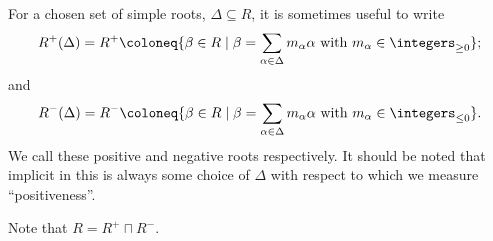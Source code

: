 \documentclass[fleqn]{NotesClass}
\begin{document}
    \begin{ntn}{}{}
        For a chosen set of simple roots, \(\Delta \subseteq R\), it is sometimes useful to write
        \begin{equation}
            R^+(\Delta) = R^+ \coloneq \{\beta \in R \mid \beta = \sum_{\alpha \in \Delta} m_\alpha \alpha \text{ with } m_\alpha \in \integers_{\ge 0}\};
        \end{equation}
        and
        \begin{equation}
            R^{-}(\Delta) = R^- \coloneq \{\beta \in R \mid \beta = \sum_{\alpha \in \Delta} m_\alpha \alpha \text{ with } m_\alpha \in \integers_{\le 0}\}.
        \end{equation}
        We call these positive and negative roots respectively.
        It should be noted that implicit in this is always some choice of \(\Delta\) with respect to which we measure \enquote{positiveness}.
        
        Note that \(R = R^+ \sqcap R^-\).
    \end{ntn}
    
\end{document}
